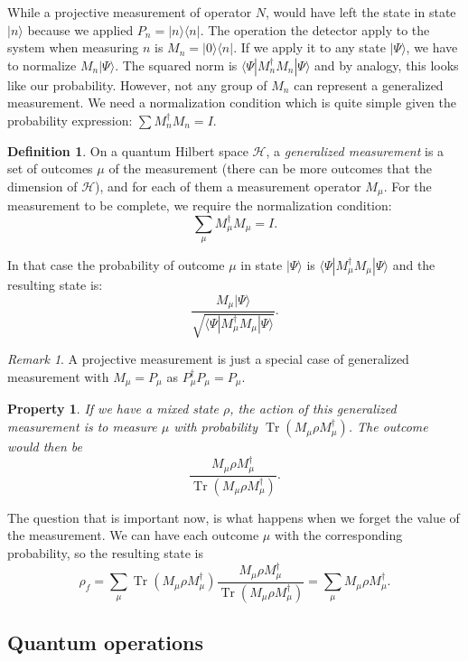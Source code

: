 \documentclass[10pt,a4paper]{report}
\theoremstyle{plain}
\newtheorem{prop}[thm]{Property}
\theoremstyle{definition}
\newtheorem{defn}{Definition}[chapter]
\theoremstyle{remark}
\newtheorem*{rem}{Remark}
\newcommand{\ket}[1]{|#1\rangle}
\newcommand{\bra}[1]{\langle#1|}
\DeclareMathOperator{\Tr}{Tr}
\newcommand{\trnorm}[1]{\frac{#1}{\Tr\left({#1}\right)}}
\begin{document}
While a projective measurement of operator $N$, would have left the state in
state $\ket n$ because we applied $P_n = \ket n \bra n$.
The operation the detector apply to the system when measuring $n$ is $M_n = \ket
0 \bra n$. If we apply it to any state $\ket \Psi$, we have to normalize $M_n
\ket \Psi$. The squared norm is $\bra \Psi M_n^\dagger M_n \ket \Psi$ and by
analogy, this looks like our probability. However, not any group of $M_n$ can
represent a generalized measurement. We need a normalization condition which is
quite simple given the probability expression: $\sum M_n^\dagger M_n = I$.

\begin{defn}
  On a quantum Hilbert space $\mathcal{H}$, a \emph{generalized measurement} is a set
  of outcomes $\mu$ of the measurement (there can be more outcomes that the
  dimension of $\mathcal{H}$), and for each of them a measurement
  operator $M_\mu$. For the measurement to be complete, we require the
  normalization condition:
  \[\sum_\mu M_\mu^\dagger M_\mu = I.\]

  In that case the probability of outcome $\mu$ in state $\ket \Psi$ is $\bra \Psi
  M_\mu^\dagger M_\mu \ket \Psi$ and the resulting state is:
\[\frac{M_\mu \ket \Psi}{\sqrt{\bra \Psi M_\mu^\dagger M_\mu \ket \Psi}}.\]
\end{defn}

\begin{rem}
  A projective measurement is just a special case of generalized measurement
  with $M_\mu=P_\mu$ as $P_\mu^\dagger P_\mu = P_\mu$.
\end{rem}

\begin{prop}
  If we have a mixed state $\rho$, the action of this generalized measurement is
  to measure $\mu$ with probability $\Tr(M_\mu\rho M_\mu^\dagger)$. The outcome would
  then be
  \[\trnorm{M_\mu\rho M_\mu^\dagger}.\]
\end{prop}

The question that is important now, is what happens when we forget the value of
the measurement. We can have each outcome $\mu$ with the corresponding
probability, so the resulting state is
\[\rho_f = \sum_\mu \Tr(M_\mu\rho M_\mu^\dagger)\trnorm{M_\mu\rho M_\mu^\dagger}
  =\sum_\mu M_\mu\rho M_\mu^\dagger.\]



\subsection{Quantum operations}
\end{document}
